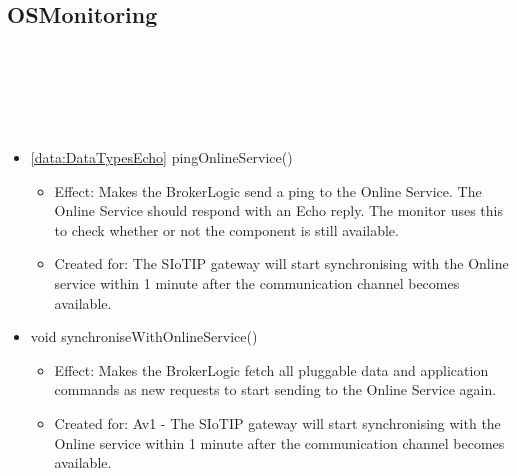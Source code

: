   \subsection{OSMonitoring}\label{int:GatewayGatewayOnlineServiceCommunicationHandlerOSCommunicationLogicOSMonitoring}
    \begin{description}
      \item[Provided by:] \iconcomponent{}~
      \item[Required by:] \iconcomponent{}~
      \item[Operations:] ~
    \begin{itemize}[noitemsep,nolistsep,leftmargin=-.25cm]
      \item \textsf{\ref{data:DataTypesEcho} pingOnlineService()}
        \begin{itemize}[noitemsep,nolistsep]
           \item Effect: Makes the BrokerLogic send a ping to the Online Service. The Online Service should respond with an Echo reply. The monitor uses this to check whether or not the component is still available.
\item Created for: The SIoTIP gateway will start synchronising with the Online service within 1 minute after the communication channel becomes available.
        \end{itemize}
      \item \textsf{void synchroniseWithOnlineService()}
        \begin{itemize}[noitemsep,nolistsep]
           \item Effect: Makes the BrokerLogic fetch all pluggable data and application commands as new requests to start sending to the Online Service again.
\item Created for: Av1 - The SIoTIP gateway will start synchronising with the Online service within 1 minute after the communication channel becomes available.
        \end{itemize}
    \end{itemize}
    \end{description}


